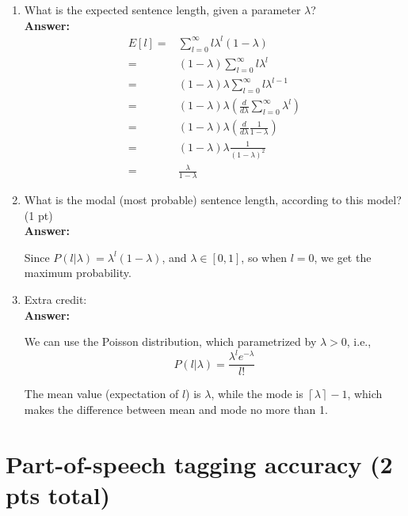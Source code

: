 \documentclass[twoside,11pt]{article}\usepackage{amsmath,amsfonts,amsthm,fullpage}
\begin{document}
	\begin{enumerate}
		\item What is the expected sentence length, given a parameter $\lambda$? \\
		\textbf{Answer:}
	\begin{align*}
		E[l] =& \sum_{l=0}^{\infty} l \lambda^{l}(1 - \lambda) \\
			=& (1 - \lambda) \sum_{l=0}^{\infty} l \lambda^l \\
			=& (1-\lambda)\lambda \sum_{l=0}^{\infty} l \lambda^{l-1} \\
			=& (1-\lambda)\lambda \left( \frac{d}{d\lambda} \sum_{l=0}^{\infty}\lambda^l \right) \\
			=& (1-\lambda)\lambda \left( \frac{d}{d\lambda} \frac{1}{1-\lambda} \right) \\ 
			=& (1-\lambda)\lambda \frac{1}{(1-\lambda)^2} \\
			=& \frac{\lambda}{1 - \lambda}
	\end{align*}
		\item What is the modal (most probable) sentence length, according to this
model? (1 pt) \\
		\textbf{Answer:}
		
		Since $P(l | \lambda) = \lambda^l (1-\lambda)$, and $\lambda \in [0, 1]$, so when $l=0$, we get the maximum probability. 
		
		\item Extra credit: \\
		\textbf{Answer:}
		 	
		 	We can use the Poisson distribution, which parametrized by $\lambda > 0$, i.e.,
\[
	P(l | \lambda) = \frac{\lambda^l e^{-\lambda}}{l!}
\]

		The mean value (expectation of $l$) is $\lambda$, while the mode is $\left \lceil{\lambda}\right \rceil - 1$, which makes the difference between mean and mode no more than 1. 
		 
	\end{enumerate}
	
\section{Part-of-speech tagging accuracy (2 pts total)}
\end{document}
